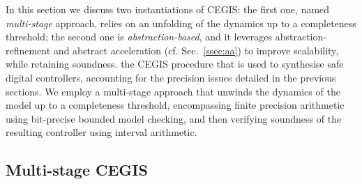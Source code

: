 In this section we discuss 
\ifx\axelerator
two instantiations of CEGIS: 
the first one,
named {\it multi-stage} approach, 
relies on an unfolding of the dynamics up to a completeness threshold; 
the second one is {\it abstraction-based}, 
and it leverages abstraction-refinement \cite{DBLP:conf/cav/ClarkeGJLV00} and abstract acceleration (cf. Sec.~\ref{ssec:aa}) to improve scalability,  
while retaining soundness. 
\else
the CEGIS procedure that is used to synthesise safe digital controllers, 
accounting for the precision issues detailed in the previous sections. 
We employ a multi-stage approach that unwinds the dynamics of the model up to a completeness threshold, 
encompassing finite precision arithmetic using bit-precise bounded model checking, 
and then verifying soundness of the resulting controller using interval arithmetic. 
\fi

\ifx\axelerator
\subsection{Multi-stage CEGIS} 
\label{sssec:naive}
\fi

